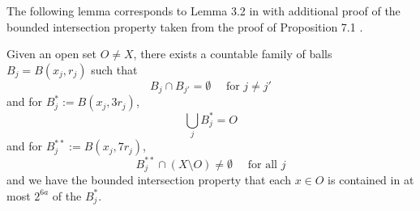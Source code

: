 The following lemma corresponds to Lemma 3.2 in \cite{stein-book} with additional proof of the bounded intersection property taken from the proof of Proposition 7.1 .
\begin{lemma}
    \label{ball-covering}
    Given an open set $O\ne X$, there exists a countable family of balls $B_j = B(x_j, r_j)$ such that
    \begin{equation}
        \label{balls-disjoint}
        B_j \cap B_{j'} = \emptyset \quad \text{ for } j \ne j'
    \end{equation}
    and for $B_j^* := B(x_j, 3r_j)$,
    \begin{equation}
        \label{balls-covering}
        \bigcup_j B_j^* = O
    \end{equation}
    and for $B_j^{**} := B(x_j, 7r_j)$,
    \begin{equation}
        \label{enlarged-balls-intersect-complement}
        B_j^{**} \cap (X \setminus O) \ne \emptyset \quad \text{ for all } j
    \end{equation}
    and we have the bounded intersection property that each $x\in O$ is contained in at most $2^{6a}$ of the $B_j^*$.
\end{lemma}
